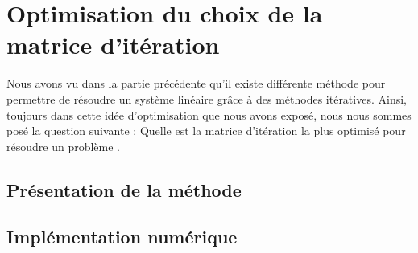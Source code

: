 \chapter{Optimisation du choix de la matrice d'itération}
Nous avons vu dans la partie précédente qu'il existe différente méthode pour permettre de résoudre un système linéaire grâce à des méthodes itératives. Ainsi, toujours dans cette idée d'optimisation que nous avons exposé, nous nous sommes posé la question suivante : \og Quelle est la matrice d'itération la plus optimisé pour résoudre un problème \fg.
\section{Présentation de la méthode}
\section{Implémentation numérique}